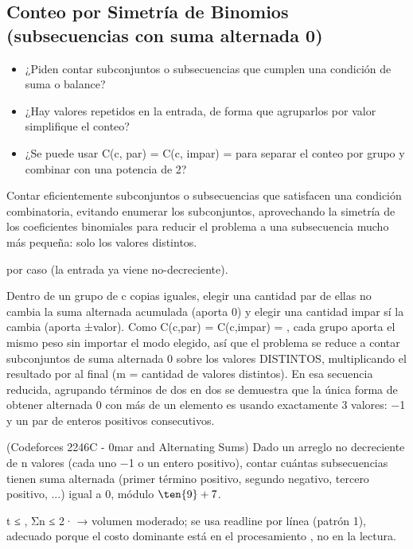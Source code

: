 \subsection{Conteo por Simetría de Binomios (subsecuencias con suma alternada 0)}


\begin{itemize}
\item ¿Piden contar subconjuntos o subsecuencias que cumplen una condición de suma o balance?
\item ¿Hay valores repetidos en la entrada, de forma que agruparlos por valor simplifique el conteo?
\item ¿Se puede usar C(c, par) = C(c, impar) =  para separar el conteo por grupo y combinar con una potencia de 2?
\end{itemize}

 Contar eficientemente subconjuntos o subsecuencias que satisfacen una condición combinatoria, evitando enumerar los  subconjuntos, aprovechando la simetría de los coeficientes binomiales para reducir el problema a una subsecuencia mucho más pequeña: solo los valores distintos.

  por caso (la entrada ya viene no-decreciente).

 Dentro de un grupo de c copias iguales, elegir una cantidad par de ellas no cambia la suma alternada acumulada (aporta 0) y elegir una cantidad impar sí la cambia (aporta ±valor). Como C(c,par) = C(c,impar) = , cada grupo aporta el mismo peso sin importar el modo elegido, así que el problema se reduce a contar subconjuntos de suma alternada 0 sobre los valores DISTINTOS, multiplicando el resultado por  al final (m = cantidad de valores distintos). En esa secuencia reducida, agrupando términos de dos en dos se demuestra que la única forma de obtener alternada 0 con más de un elemento es usando exactamente 3 valores: −1 y un par de enteros positivos consecutivos.


(Codeforces 2246C - 0mar and Alternating Sums) Dado un arreglo no decreciente de n valores (cada uno −1 o un entero positivo), contar cuántas subsecuencias tienen suma alternada (primer término positivo, segundo negativo, tercero positivo, ...) igual a 0, módulo $\ten{9}+7$.

 t ≤ , Σn ≤ 2· → volumen moderado; se usa readline por línea (patrón 1), adecuado porque el costo dominante está en el procesamiento , no en la lectura.

